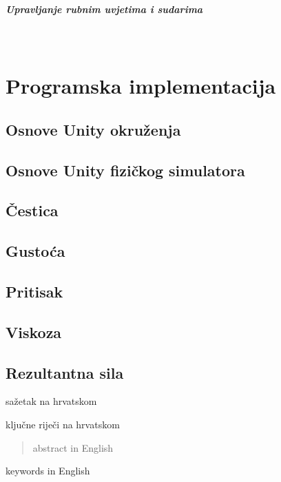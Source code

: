 \documentclass[diplomskirad]{fer}
\newcommand{\paragraphnewline}[1]{\paragraph{#1}\mbox{}\\}
\begin{document}
    \paragraphnewline{Upravljanje rubnim uvjetima i sudarima}


    \chapter{Programska implementacija}\label{ch:programska-implementacija}

    \section{Osnove Unity okruženja}\label{sec:osnove-unity-okruzenja}
    \section{Osnove Unity fizičkog simulatora}\label{sec:osnove-unity-fizickog-simulatora}
    \section{Čestica}\label{sec:cestica}
    \section{Gustoća}\label{sec:gustoca}
    \section{Pritisak}\label{sec:pritisak}
    \section{Viskoza}\label{sec:viskoza}
    \section{Rezultantna sila}\label{sec:rezultantna-sila}


    
    \begin{sazetak}
        sažetak na hrvatskom
    \end{sazetak}
    \begin{kljucnerijeci}
        ključne riječi na hrvatskom
    \end{kljucnerijeci}
    \begin{abstract}
        abstract in English
    \end{abstract}
    \begin{keywords}
        keywords in English
    \end{keywords}
\end{document}
